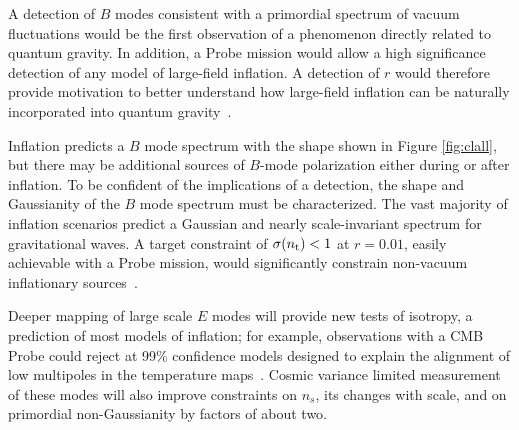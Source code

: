 A detection of $B$ modes consistent with a primordial spectrum of vacuum fluctuations would be the first observation of a phenomenon directly related to quantum gravity. In addition, a Probe mission would allow a high significance detection of any model of large-field inflation.
A detection of $r$ would therefore provide 
motivation to better understand how large-field inflation can be naturally incorporated into quantum gravity~\cite{Banks:2003sx,Baumann:2014nda,Brown:2015iha,Rudelius:2015xta,Silverstein:2008sg,Kaloper:2008fb,Marchesano:2014mla,Blumenhagen:2015xpa}. 

Inflation predicts a $B$ mode spectrum with the shape shown in Figure \ref{fig:clall}, but there may be additional sources 
of $B$-mode polarization either during or after 
inflation. To be confident of the implications of a detection, the shape and Gaussianity of the $B$ mode spectrum 
must be characterized. The vast majority of inflation scenarios predict a Gaussian and nearly scale-invariant spectrum for 
gravitational waves. A target constraint of $\sigma(n_{\rm t})<1$ at $r=0.01$, easily achievable with a Probe mission, would significantly constrain non-vacuum 
inflationary sources~\cite{Namba:2015gja,Peloso:2016gqs}.

Deeper mapping of large scale $E$ modes will provide new tests of isotropy, a prediction of most models of inflation; 
for example, observations with a CMB Probe could reject at 99\% confidence models designed to explain the alignment of low 
multipoles in the temperature maps~\cite{Dvorkin:2007jp}. 
Cosmic variance limited measurement of these modes will also improve constraints on $n_{s}$, 
its changes with scale, and on primordial non-Gaussianity by factors of about two. 

